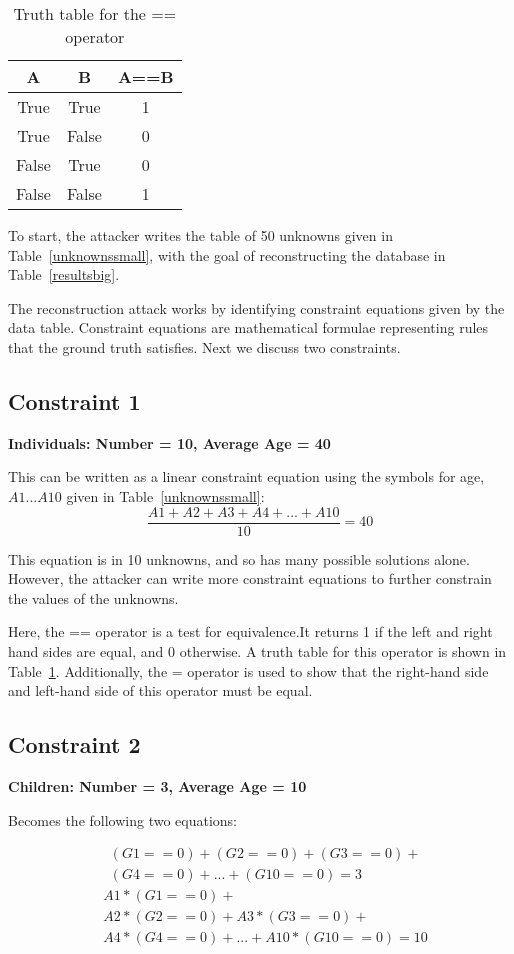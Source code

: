 \documentclass[runningheads]{llncs}
\begin{document}
\begin{table}
\begin{tabular}{cc|c}
A & B & A==B  \\
\hline
True & True & 1   \\
True & False & 0  \\
False & True & 0  \\
False & False & 1  \\
\hline
\end{tabular}
\caption{Truth table for the == operator}\label{truthtable}
\end{table}


 To start, the attacker writes the table of 50 unknowns given in Table~\ref{unknownssmall}, with the goal of reconstructing the database in Table~\ref{resultsbig}.



The reconstruction attack works by identifying constraint
equations given by the data table. Constraint equations are  mathematical formulae representing rules that the ground truth satisfies. Next we discuss two constraints.
\subsection{Constraint 1}
\textbf{Individuals: Number = 10, Average Age = 40}


This can be written as a linear constraint equation using the symbols for age, $A1...A10$ given in Table~\ref{unknownssmall}:
\[\frac{A1 + A2 + A3 + A4 +...+ A10}{10} = 40\]

This equation is in 10 unknowns, and so has many possible solutions alone.
However, the attacker can write more constraint equations to further constrain the values of the unknowns.

Here, the == operator is a test for equivalence.It returns 1 if the left and right hand sides are equal, and 0 otherwise. A truth table for this operator is shown in Table~\ref{truthtable}. Additionally, the = operator is used to show that the right-hand side and left-hand side of this operator must be equal.

\subsection{Constraint 2}
\textbf{Children: Number = 3, Average Age = 10}


Becomes the following two equations:

\begin{align*}
& (G1==0) + (G2==0) + (G3==0)+\\
& (G4==0)+...+(G10==0) = 3
\end{align*}
\begin{align*}
&  A1 * (G1==0) + \\
&  A2 * (G2==0) + A3 * (G3==0) +\\
&  A4 * (G4==0) +...+ A10 * (G10==0) = 10
\end{align*}
\end{document}
